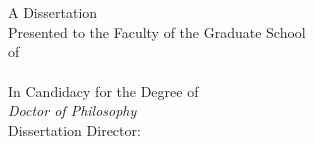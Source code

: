 %

\begin{titlepage}
\begin{center}

{\Large \textbf{\thesisTitle}}\\[1.5cm]

{\large \textit{\yourName}}\\[2cm]

\vfill

{\large A Dissertation}\\[0.2cm]
{\large Presented to the Faculty of the Graduate School}\\[0.2cm]
{\large of}\\[0.2cm]
{\Large \textit{\yourSchool}}\\[1.2cm]

{\large In Candidacy for the Degree of}\\[0.2cm]
{\Large \textit{Doctor of Philosophy}}\\[1.2cm]

{\large Dissertation Director: \yourAdvisor}\\[1cm]

{\large \textperiodcentered \hspace{0.5em} \textperiodcentered \hspace{0.5em} \textperiodcentered}\\[0.2cm]

{\large \yourMonth{} \yourYear{}}

\end{center}
\end{titlepage}
\restoregeometry